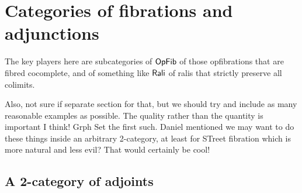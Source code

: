 \documentclass{amsart}
\begin{document}
\begin{comment}
Thoughts about these assumptions. Here are the desired examples I can think of now: $ \cat{Set} $ together with $ \cat{Graph} $ or $ \cat{Top} $. The enriched over sets and completeness are both there. So is essential surjectivity. And reflection of isomorphisms.  The continuity is definitely needed, since it's necessary if $ R $ is a right adjoint. 

Go back to the right adjoint we had in the ``converse'' to the above theorem.  That is, we have a coreflection $ \L \dashv R \from \cat{C} \leftrightarrow \cat{D} $ where $ \L $ is left exact.  Of course this gives the continuity of $ R $. Essential surjectivity follows from Gabriel-Zisman. Is it a Street opfibration? $ \L $ is conservative, but is $ R $?

\begin{ex}
  No, $ R $ is not in general conservative.
  Consider the underlying node functor
  $ \Grph \to \Set $.  All $ \Grph $-endomorphisms
  on
  \[
    \begin{tikzpicture}
      \node (a) at (0,0) {$ \bullet $};
      \node (b) at (2,0) {$ \bullet $};
      \draw [->] (a.30) to (b.150);
      \draw [->] (a.-30) to (b.-150);
    \end{tikzpicture}
  \]
  are sent to the identity on $ 2 $.
\end{ex}
\end{comment}

\section{Categories of fibrations and adjunctions}

The key players here are subcategories of $\mathsf{OpFib}$ of those
opfibrations that are fibred cocomplete, and of something
like $\mathsf{Rali}$ of ralis that strictly preserve all colimits.

{\chris Also, not sure if separate section for that, but we should try and include as many reasonable examples as possible. The quality rather
than the quantity is important I think! Grph Set the first such.}
{\chris Daniel mentioned we may want to do these things inside an arbitrary 2-category, at least for STreet fibration which is more natural and less evil? That would certainly be cool!}

\subsection{A 2-category of adjoints}
\label{sec:category-adjoints}
\end{document}
